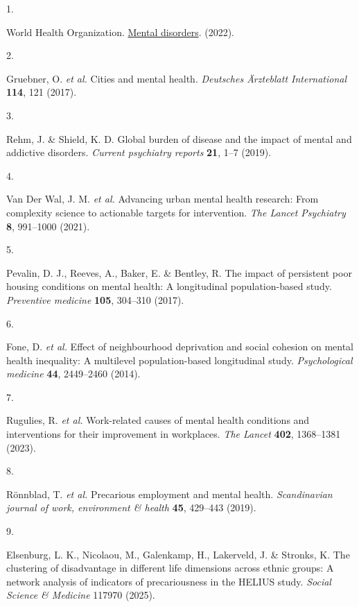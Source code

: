 \documentclass[
]{article}
\newlength{\cslhangindent}
\newlength{\csllabelwidth}
\newenvironment{CSLReferences}[2] %
 {\begin{list}{}{%
  \setlength{\itemindent}{0pt}
  \setlength{\leftmargin}{0pt}
  \setlength{\parsep}{0pt}
  \ifodd #1
   \setlength{\leftmargin}{\cslhangindent}
   \setlength{\itemindent}{-1\cslhangindent}
  \fi
  \setlength{\itemsep}{#2\baselineskip}}}
 {\end{list}}
\newcommand{\CSLLeftMargin}[1]{\parbox[t]{\csllabelwidth}{\strut#1\strut}}
\newcommand{\CSLRightInline}[1]{\parbox[t]{\linewidth - \csllabelwidth}{\strut#1\strut}}
\begin{document}
\label{refs}
\begin{CSLReferences}{0}{0}
\CSLLeftMargin{1. }%
\CSLRightInline{World Health Organization.
\href{https://www.who.int/news-room/fact-sheets/detail/mental-disorders}{Mental
disorders}. (2022).}

\CSLLeftMargin{2. }%
\CSLRightInline{Gruebner, O. \emph{et al.} Cities and mental health.
\emph{Deutsches {Ä}rzteblatt International} \textbf{114}, 121 (2017).}

\CSLLeftMargin{3. }%
\CSLRightInline{Rehm, J. \& Shield, K. D. Global burden of disease and
the impact of mental and addictive disorders. \emph{Current psychiatry
reports} \textbf{21}, 1--7 (2019).}

\CSLLeftMargin{4. }%
\CSLRightInline{Van Der Wal, J. M. \emph{et al.} Advancing urban mental
health research: From complexity science to actionable targets for
intervention. \emph{The Lancet Psychiatry} \textbf{8}, 991--1000
(2021).}

\CSLLeftMargin{5. }%
\CSLRightInline{Pevalin, D. J., Reeves, A., Baker, E. \& Bentley, R. The
impact of persistent poor housing conditions on mental health: A
longitudinal population-based study. \emph{Preventive medicine}
\textbf{105}, 304--310 (2017).}

\CSLLeftMargin{6. }%
\CSLRightInline{Fone, D. \emph{et al.} Effect of neighbourhood
deprivation and social cohesion on mental health inequality: A
multilevel population-based longitudinal study. \emph{Psychological
medicine} \textbf{44}, 2449--2460 (2014).}

\CSLLeftMargin{7. }%
\CSLRightInline{Rugulies, R. \emph{et al.} Work-related causes of mental
health conditions and interventions for their improvement in workplaces.
\emph{The Lancet} \textbf{402}, 1368--1381 (2023).}

\CSLLeftMargin{8. }%
\CSLRightInline{Rönnblad, T. \emph{et al.} Precarious employment and
mental health. \emph{Scandinavian journal of work, environment \&
health} \textbf{45}, 429--443 (2019).}

\CSLLeftMargin{9. }%
\CSLRightInline{Elsenburg, L. K., Nicolaou, M., Galenkamp, H.,
Lakerveld, J. \& Stronks, K. The clustering of disadvantage in different
life dimensions across ethnic groups: A network analysis of indicators
of precariousness in the HELIUS study. \emph{Social Science \& Medicine}
117970 (2025).}


\end{CSLReferences}
\end{document}
